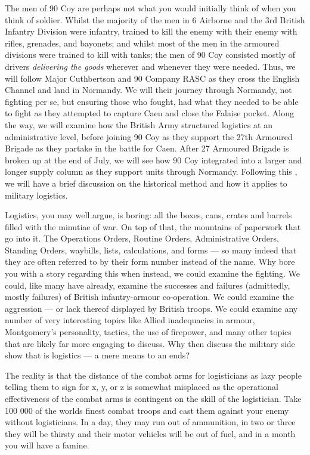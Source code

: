 \documentclass[noraggedright]{turabian-researchpaper}
\begin{document}
The men of 90 Coy are perhaps not what you would initially think of when you
 think of soldier.  Whilst the majority of the men in 6 Airborne and the 3rd 
British Infantry Division were infantry, trained to kill the enemy with
their enemy with rifles, grenades, and bayonets; and whilst most of the men in
the armoured divisions were trained to kill with tanks; the men of 90 Coy
consisted mostly of drivers \textit{delivering the goods} wherever and whenever
they were needed.  Thus, we will follow Major Cuthbertson and 90 Company RASC
as they cross the English Channel and land in Normandy.  We will their journey
through Normandy, not fighting per se, but ensuring those who fought, had what
they needed to be able to fight as they attempted to capture Caen and close
the Falaise pocket.  Along the way, we will examine how the British Army
structured logistics at an administrative level, before joining 90 Coy as they
support the 27th Armoured Brigade as they partake in the battle for Caen.  
After 27 Armoured Brigade is broken up at the end of July, we will see how 
90 Coy integrated into a larger and longer supply column as they support units
through Normandy.  Following this , we will have a brief discussion on the 
historical method and how it applies to military logistics.  

Logistics, you may well argue, is boring:  all the boxes, cans, crates and
barrels filled with the minutiae of war.  On top of that, the mountains of
paperwork that go into it.  The Operations Orders, Routine Orders,
Administrative Orders, Standing Orders, waybills, lists, calculations, 
and forms --- so many indeed that they are often referred to by their form 
number instead of the name.  Why bore you with a story regarding this when 
instead, we could examine the fighting.  We could, like many have already,
examine the successes and failures (admittedly, mostly failures) of British
infantry-armour co-operation.  We could examine the aggression --- or lack 
thereof displayed by British troops.  We could examine any number of very
interesting topics like Allied inadequacies in armour, Montgomery's 
personality, tactics, the use of firepower, and many other topics that are
likely far more engaging to discuss.  Why then discuss the military side 
show that is logistics --- a mere means to an ends?  

The reality is that the distance of the combat arms for logisticians as lazy
people telling them to sign for x, y, or z is somewhat misplaced as the 
operational effectiveness of the combat arms is contingent on the skill of
the logistician.  Take 100 000 of the worlds finest combat troops and cast them 
against your enemy without logisticians.  In a day, they may run out of 
ammunition, in two or three they will be thirsty and their motor vehicles
will be out of fuel, and in a month you will have a famine.  
\end{document}
